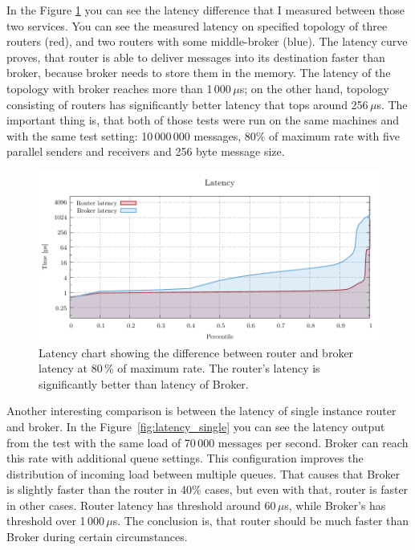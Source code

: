 In the Figure \ref{fig:latency} you can see the latency difference that I measured between those two services. You can see the measured latency on specified topology of three routers (red), and two routers with some middle-broker (blue). The latency curve proves, that router is able to deliver messages into its destination faster than broker, because broker needs to store them in the memory. The latency of the topology with broker reaches more than 1\,000\,$\mu$s; on the other hand, topology consisting of routers has significantly better latency that tops around 256\,$\mu$s. The important thing is, that both of those tests were run on the same machines and with the same test setting: 10\,000\,000 messages, 80\% of maximum rate with five parallel senders and receivers and 256 byte message size.


\begin{figure}[h]
	\centering
	\includegraphics[width=1\linewidth]{obrazky-figures/charts-excel/latency.pdf}
	\caption{Latency chart showing the difference between router and broker latency at 80\,\% of maximum rate. The router's latency is significantly better than latency of Broker.}
	\label{fig:latency}
\end{figure}

Another interesting comparison is between the latency of single instance router and broker. In the Figure~\ref{fig:latency_single} you can see the latency output from the test with the same load of 70\,000 messages per second. Broker can reach this rate with additional queue settings. This configuration improves the distribution of incoming load between multiple queues. That causes that Broker is slightly faster than the router in 40\% cases, but even with that, router is faster in other cases. Router latency has threshold around 60\,$\mu$s, while Broker's has threshold over 1\,000\,$\mu$s. The conclusion is, that router should be much faster than Broker during certain circumstances.

